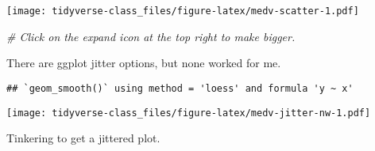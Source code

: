 \documentclass[]{book}
\newenvironment{Shaded}{\begin{snugshade}}{\end{snugshade}}
\newcommand{\KeywordTok}[1]{\textcolor[rgb]{0.13,0.29,0.53}{\textbf{#1}}}
\newcommand{\DataTypeTok}[1]{\textcolor[rgb]{0.13,0.29,0.53}{#1}}
\newcommand{\FloatTok}[1]{\textcolor[rgb]{0.00,0.00,0.81}{#1}}
\newcommand{\StringTok}[1]{\textcolor[rgb]{0.31,0.60,0.02}{#1}}
\newcommand{\CommentTok}[1]{\textcolor[rgb]{0.56,0.35,0.01}{\textit{#1}}}
\newcommand{\OtherTok}[1]{\textcolor[rgb]{0.56,0.35,0.01}{#1}}
\newcommand{\OperatorTok}[1]{\textcolor[rgb]{0.81,0.36,0.00}{\textbf{#1}}}
\newcommand{\NormalTok}[1]{#1}
\begin{document}
\texttt{[image: tidyverse-class\_files/figure-latex/medv-scatter-1.pdf]}

\begin{Shaded}
\begin{Highlighting}[]
\CommentTok{# Click on the expand icon at the top right to make bigger.}
\end{Highlighting}
\end{Shaded}

There are ggplot jitter options, but none worked for me.

\begin{Shaded}
\end{Shaded}

\begin{verbatim}
## `geom_smooth()` using method = 'loess' and formula 'y ~ x'
\end{verbatim}

\texttt{[image: tidyverse-class\_files/figure-latex/medv-jitter-nw-1.pdf]}

Tinkering to get a jittered plot.
\end{document}
